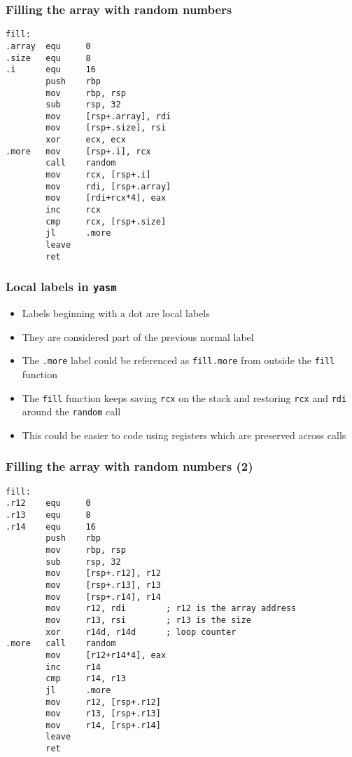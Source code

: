 \documentclass{beamer}
\begin{document}
\begin{frame}[fragile]
    \frametitle{Filling the array with random numbers}
\footnotesize
\begin{verbatim}
fill:
.array  equ     0
.size   equ     8
.i      equ     16
        push    rbp
        mov     rbp, rsp
        sub     rsp, 32
        mov     [rsp+.array], rdi
        mov     [rsp+.size], rsi
        xor     ecx, ecx
.more   mov     [rsp+.i], rcx
        call    random
        mov     rcx, [rsp+.i]
        mov     rdi, [rsp+.array]
        mov     [rdi+rcx*4], eax
        inc     rcx
        cmp     rcx, [rsp+.size]
        jl      .more
        leave
        ret
\end{verbatim}
\end{frame}

\begin{frame}
    \frametitle{Local labels in {\tt yasm}}
    \begin{itemize}
        \item Labels beginning with a dot are local labels
        \item They are considered part of the previous normal label
        \item The {\tt .more} label could be referenced as {\tt fill.more}
              from outside the {\tt fill} function
        \item The {\tt fill} function keeps saving {\tt rcx} on the stack and
              restoring {\tt rcx} and {\tt rdi} around the {\tt random} call
        \item This could be easier to code using registers which are preserved
              across calls
    \end{itemize}
\end{frame}


\begin{frame}[fragile]
    \frametitle{Filling the array with random numbers (2)}
\scriptsize
\begin{verbatim}
fill:
.r12    equ     0
.r13    equ     8
.r14    equ     16
        push    rbp
        mov     rbp, rsp
        sub     rsp, 32
        mov     [rsp+.r12], r12
        mov     [rsp+.r13], r13
        mov     [rsp+.r14], r14
        mov     r12, rdi        ; r12 is the array address
        mov     r13, rsi        ; r13 is the size
        xor     r14d, r14d      ; loop counter
.more   call    random
        mov     [r12+r14*4], eax
        inc     r14
        cmp     r14, r13
        jl      .more
        mov     r12, [rsp+.r12]
        mov     r13, [rsp+.r13]
        mov     r14, [rsp+.r14]
        leave
        ret
\end{verbatim}
\end{frame}
\end{document}
